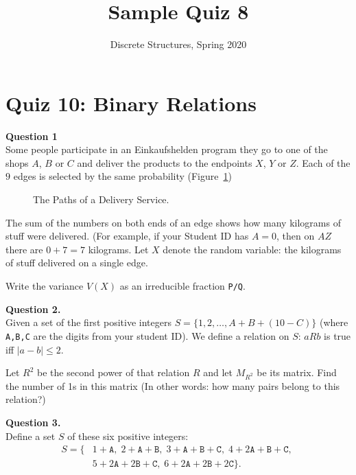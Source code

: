 \documentclass[jou]{apa6}
\title{Sample Quiz 8}
\author{Discrete Structures, Spring 2020}
\affiliation{RBS}
\begin{document}

\twocolumn
\section{Quiz 10: Binary Relations}

\vspace{6pt}
{\bf Question 1}\\
Some people participate in an Einkaufshelden program \textendash{} they 
go to one of the shops $A$, $B$ or $C$ and deliver the products to the endpoints
$X$, $Y$ or $Z$. Each of the $9$ edges is selected by the same probability 
(Figure~\ref{fig:k33-weights})

\begin{figure}[!htb]
\caption{\label{fig:k33-weights} The Paths of a Delivery Service.}
\end{figure}


The sum of the numbers on both ends of an edge shows 
how many kilograms of stuff were delivered. (For example, if your Student ID has 
$A=0$, then on $AZ$ there are $0+7 = 7$ kilograms.
Let $X$ denote the random variable: the kilograms of stuff delivered
on a single edge.

Write the variance $V(X)$ as an irreducible fraction {\tt P/Q}. 


\vspace{6pt}
{\bf Question 2.}\\
Given a set of the first positive integers $S = \{ 1,2,\ldots,A+B+(10-C) \}$
(where {\tt A,B,C} are the digits from your student ID). 
We define a relation on $S$: $aRb$ is true iff $|a - b| \leq 2$.

Let $R^2$ be the second power of that relation $R$ and let $M_{R^2}$
be its matrix. Find the number of 1s in this matrix (In other words: 
how many pairs belong to this relation?)


\vspace{6pt}
{\bf Question 3.}\\
Define a set $S$ of these six positive integers: 
\begin{align}
S = \{ & 1+\mathtt{A},\; 2+\mathtt{A}+\mathtt{B},\; 3+\mathtt{A}+\mathtt{B}+\mathtt{C},\;
4 + 2\mathtt{A}+\mathtt{B}+\mathtt{C},\; \nonumber \\
 & 5 + 2\mathtt{A}+2\mathtt{B}+\mathtt{C},\;
6 + 2\mathtt{A}+2\mathtt{B}+2\mathtt{C}\}. \nonumber
\end{align}
\end{document}
